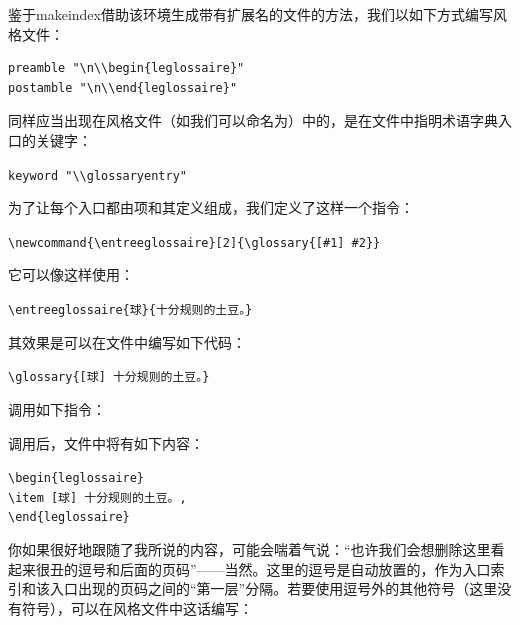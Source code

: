 鉴于\textsf{makeindex}借助该环境生成带有扩展名的文件的方法，我们以如下方式编写风格文件：

\begin{dmd}
\begin{verbatim}
preamble "\n\\begin{leglossaire}"
postamble "\n\\end{leglossaire}"\end{verbatim}
\end{dmd}

同样应当出现在风格文件（如我们可以命名为）中的，是在文件中指明术语字典入口的关键字：

\begin{dmd}
\verb|keyword "\\glossaryentry"|
\end{dmd}

为了让每个入口都由项和其定义组成，我们定义了这样一个指令：

\begin{dmd}
\verb|\newcommand{\entreeglossaire}[2]{\glossary{[#1] #2}}|
\end{dmd}

它可以像这样使用：

\begin{dmd}
\verb|\entreeglossaire{球}{十分规则的土豆。}|
\end{dmd}

其效果是可以在文件中编写如下代码：

\begin{dmd}
\verb|\glossary{[球] 十分规则的土豆。}|
\end{dmd}

调用如下指令：


调用后，文件中将有如下内容：

\begin{dmd}
\verb+\begin{leglossaire}+\\
\verb+\item [球] 十分规则的土豆。, + \\
\verb+\end{leglossaire}+
\end{dmd}

你如果很好地跟随了我所说的内容，可能会喘着气说：“也许我们会想删除这里看起来很丑的逗号和后面的页码”——当然。这里的逗号是自动放置的，作为入口索引和该入口出现的页码之间的“第一层”分隔。若要使用逗号外的其他符号（这里没有符号），可以在风格文件中这话编写：

